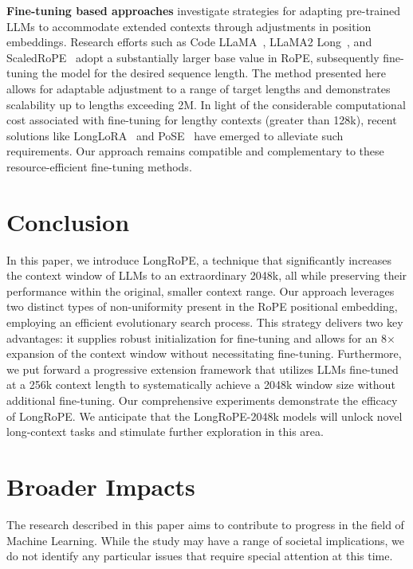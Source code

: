 \textbf{Fine-tuning based approaches} investigate strategies for adapting pre-trained LLMs to accommodate extended contexts through adjustments in position embeddings. Research efforts such as Code LLaMA~\cite{codellama}, LLaMA2 Long~\cite{xiong2023effective}, and ScaledRoPE~\cite{liu2023scaling} adopt a substantially larger base value in RoPE, subsequently fine-tuning the model for the desired sequence length. The method presented here allows for adaptable adjustment to a range of target lengths and demonstrates scalability up to lengths exceeding 2M. In light of the considerable computational cost associated with fine-tuning for lengthy contexts (greater than 128k), recent solutions like LongLoRA~\cite{longlora} and PoSE~\cite{zhu2023pose} have emerged to alleviate such requirements. Our approach remains compatible and complementary to these resource-efficient fine-tuning methods.

\section{Conclusion}

In this paper, we introduce LongRoPE, a technique that significantly increases the context window of LLMs to an extraordinary 2048k, all while preserving their performance within the original, smaller context range. Our approach leverages two distinct types of non-uniformity present in the RoPE positional embedding, employing an efficient evolutionary search process. This strategy delivers two key advantages: it supplies robust initialization for fine-tuning and allows for an 8$\times$ expansion of the context window without necessitating fine-tuning. Furthermore, we put forward a progressive extension framework that utilizes LLMs fine-tuned at a 256k context length to systematically achieve a 2048k window size without additional fine-tuning. Our comprehensive experiments demonstrate the efficacy of LongRoPE. We anticipate that the LongRoPE-2048k models will unlock novel long-context tasks and stimulate further exploration in this area.

\section*{Broader Impacts} The research described in this paper aims to contribute to progress in the field of Machine Learning. While the study may have a range of societal implications, we do not identify any particular issues that require special attention at this time.

	\balance

